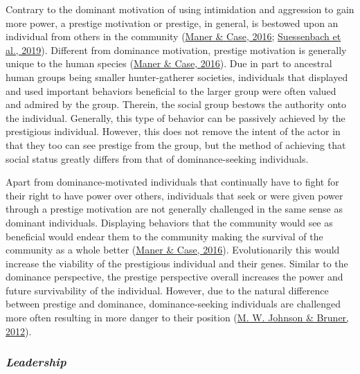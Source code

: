 \documentclass[
  donotrepeattitle,doc, 12pt, a4paper,floatsintext]{apa7}
\begin{document}
Contrary to the dominant motivation of using intimidation and aggression to gain more power, a prestige motivation or prestige, in general, is bestowed upon an individual from others in the community (\protect\hyperlink{ref-maner2016}{Maner \& Case, 2016}; \protect\hyperlink{ref-suessenbach2019}{Suessenbach et al., 2019}). Different from dominance motivation, prestige motivation is generally unique to the human species (\protect\hyperlink{ref-maner2016}{Maner \& Case, 2016}). Due in part to ancestral human groups being smaller hunter-gatherer societies, individuals that displayed and used important behaviors beneficial to the larger group were often valued and admired by the group. Therein, the social group bestows the authority onto the individual. Generally, this type of behavior can be passively achieved by the prestigious individual. However, this does not remove the intent of the actor in that they too can see prestige from the group, but the method of achieving that social status greatly differs from that of dominance-seeking individuals.

Apart from dominance-motivated individuals that continually have to fight for their right to have power over others, individuals that seek or were given power through a prestige motivation are not generally challenged in the same sense as dominant individuals. Displaying behaviors that the community would see as beneficial would endear them to the community making the survival of the community as a whole better (\protect\hyperlink{ref-maner2016}{Maner \& Case, 2016}). Evolutionarily this would increase the viability of the prestigious individual and their genes. Similar to the dominance perspective, the prestige perspective overall increases the power and future survivability of the individual. However, due to the natural difference between prestige and dominance, dominance-seeking individuals are challenged more often resulting in more danger to their position (\protect\hyperlink{ref-johnson2012}{M. W. Johnson \& Bruner, 2012}).

\hypertarget{leadership}{%
\subsubsection{\texorpdfstring{\emph{Leadership}}{Leadership}}\label{leadership}}
\end{document}
